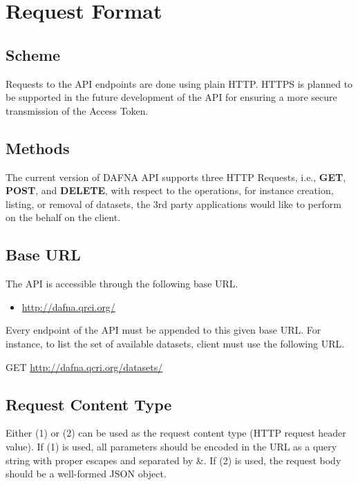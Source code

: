 \documentclass[a4paper,10pt]{scrartcl}
\begin{document}
\section{Request Format}
\subsection{Scheme}
Requests to the API endpoints are done using plain HTTP. HTTPS is planned to be supported 
in the future development of the API for ensuring a more secure transmission of the Access 
Token.
\subsection{Methods}
The current version of DAFNA API supports three HTTP Requests, i.e., \textbf{GET}, \textbf{POST}, and \textbf{DELETE}, 
with respect to the operations, for instance creation, listing, or removal of datasets, the 3rd party applications would
like to perform on the behalf on the client.
\subsection{Base URL}
The API is accessible through the following base URL.
\begin{itemize}
 \item \href{http://dafna.qrci.org/}{http://dafna.qrci.org/}
\end{itemize}
Every endpoint of the API must be appended to this given base URL.
For instance, to list the set of available datasets, client must use 
the following URL.
\begin{description}
\item GET \href{http://dafna.qcri.org/datasets/}{http://dafna.qcri.org/datasets/} 
\end{description}
\subsection{Request Content Type}
Either (1)  or (2)  can be used as the request content type (HTTP request 
header value). If (1) is used, all parameters should be encoded in the URL as a query string with proper escapes and separated by \&. If (2) is used, the request body should 
be a well-formed JSON object. 
\end{document}
